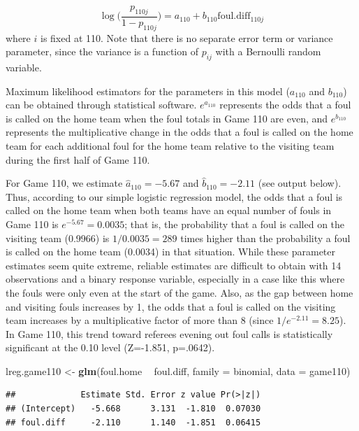 \documentclass[
]{krantz}
\newenvironment{Shaded}{\begin{snugshade}}{\end{snugshade}}
\newcommand{\DataTypeTok}[1]{\textcolor[rgb]{0.27,0.27,0.27}{#1}}
\newcommand{\KeywordTok}[1]{\textcolor[rgb]{0.27,0.27,0.27}{\textbf{#1}}}
\newcommand{\NormalTok}[1]{#1}
\newcommand{\OperatorTok}[1]{\textcolor[rgb]{0.43,0.43,0.43}{\textbf{#1}}}
\newcommand{\StringTok}[1]{\textcolor[rgb]{0.5,0.5,0.5}{#1}}
\begin{document}
\begin{equation}
\log\bigg(\frac{p_{110j}}{1-p_{110j}}\bigg)=a_{110}+b_{110}\mathrm{foul.diff}_{110j}
\label{eq:lev1glmm}
\end{equation}
where \(i\) is fixed at 110. Note that there is no separate error term or variance parameter, since the variance is a function of \(p_{ij}\) with a Bernoulli random variable.

Maximum likelihood estimators for the parameters in this model (\(a_{110}\) and \(b_{110}\)) can be obtained through statistical software. \(e^{a_{110}}\) represents the odds that a foul is called on the home team when the foul totals in Game 110 are even, and \(e^{b_{110}}\) represents the multiplicative change in the odds that a foul is called on the home team for each additional foul for the home team relative to the visiting team during the first half of Game 110.

For Game 110, we estimate \(\hat{a}_{110}=-5.67\) and \(\hat{b}_{110}=-2.11\) (see output below). Thus, according to our simple logistic regression model, the odds that a foul is called on the home team when both teams have an equal number of fouls in Game 110 is \(e^{-5.67}=0.0035\); that is, the probability that a foul is called on the visiting team (0.9966) is \(1/0.0035 = 289\) times higher than the probability a foul is called on the home team (0.0034) in that situation. While these parameter estimates seem quite extreme, reliable estimates are difficult to obtain with 14 observations and a binary response variable, especially in a case like this where the fouls were only even at the start of the game. Also, as the gap between home and visiting fouls increases by 1, the odds that a foul is called on the visiting team increases by a multiplicative factor of more than 8 (since \(1/e^{-2.11}=8.25\)). In Game 110, this trend toward referees evening out foul calls is statistically significant at the 0.10 level (Z=-1.851, p=.0642).

\begin{Shaded}
\begin{Highlighting}[]
\NormalTok{lreg.game110 <-}\StringTok{ }\KeywordTok{glm}\NormalTok{(foul.home }\OperatorTok{~}\StringTok{ }\NormalTok{foul.diff, }
                    \DataTypeTok{family =}\NormalTok{ binomial, }\DataTypeTok{data =}\NormalTok{ game110)}
\end{Highlighting}
\end{Shaded}

\begin{verbatim}
##             Estimate Std. Error z value Pr(>|z|)
## (Intercept)   -5.668      3.131  -1.810  0.07030
## foul.diff     -2.110      1.140  -1.851  0.06415
\end{verbatim}
\end{document}
